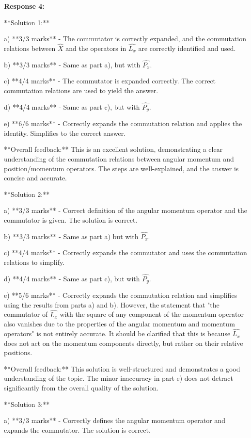 \documentclass[a4paper,11pt]{article}
\begin{document}
\textbf{Response 4:}

**Solution 1:**

a) **3/3 marks** - The commutator is correctly expanded, and the commutation relations between \( \hat{X} \) and the operators in \( \hat{L_x} \) are correctly identified and used.

b) **3/3 marks** - Same as part a), but with \( \hat{P_x} \).

c) **4/4 marks** - The commutator is expanded correctly. The correct commutation relations are used to yield the answer.

d) **4/4 marks** - Same as part c), but with \( \hat{P_y} \).

e) **6/6 marks** - Correctly expands the commutation relation and applies the identity. Simplifies to the correct answer.

**Overall feedback:** This is an excellent solution, demonstrating a clear understanding of the commutation relations between angular momentum and position/momentum operators. The steps are well-explained, and the answer is concise and accurate.

**Solution 2:**

a) **3/3 marks** - Correct definition of the angular momentum operator and the commutator is given. The solution is correct.

b) **3/3 marks** - Same as part a) but with \( \hat{P_x} \).

c) **4/4 marks** - Correctly expands the commutator and uses the commutation relations to simplify.

d) **4/4 marks** - Same as part c), but with \( \hat{P_y} \).

e) **5/6 marks** - Correctly expands the commutation relation and simplifies using the results from parts a) and b). However, the statement that "the commutator of \( \hat{L_x} \) with the square of any component of the momentum operator also vanishes due to the properties of the angular momentum and momentum operators" is not entirely accurate. It should be clarified that this is because \( \hat{L_x} \) does not act on the momentum components directly, but rather on their relative positions.

**Overall feedback:** This solution is well-structured and demonstrates a good understanding of the topic. The minor inaccuracy in part e) does not detract significantly from the overall quality of the solution.

**Solution 3:**

a) **3/3 marks** - Correctly defines the angular momentum operator and expands the commutator. The solution is correct.
\end{document}

